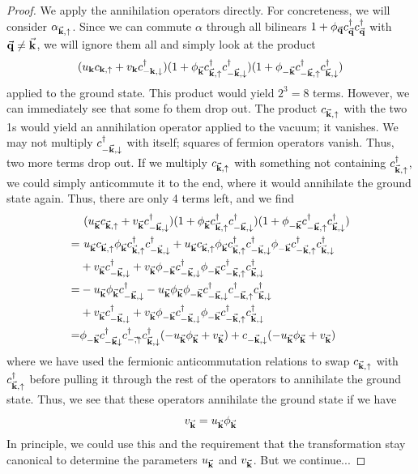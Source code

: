 \begin{proof}
	We apply the annihilation operators directly. For concreteness, we will consider $\alpha_{\va k,\uparrow}$. Since we can commute $\alpha$ through all bilinears $1+\phi_{\va q}c_{\va q}^\dagger c_{\va q}^\dagger$ with $\va q \neq \va k$, we will ignore them all and simply look at the product
	\[( u_{\mathbf{k}} c_{\mathbf{k},\uparrow} + v_{\mathbf{k}} c^\dagger_{-\mathbf{k},\downarrow})(1+\phi_{\va k}c_{\va k,\uparrow}^\dagger c_{-\va k,\downarrow}^\dagger)(1+\phi_{-\va k}c_{-\va k,\uparrow}^\dagger c_{\va k,\downarrow}^\dagger)\]
	applied to the ground state. This product would yield $2^3=8$ terms. However, we can immediately see that some fo them drop out. The product $c_{\va k,\uparrow}$ with the two 1s would yield an annihilation operator applied to the vacuum; it vanishes. We may not multiply $c_{-\va k,\downarrow}^\dagger$ with itself; squares of fermion operators vanish. Thus, two more terms drop out. If we multiply $c_{\va k,\uparrow}$ with something not containing $c_{\va k,\uparrow}^\dagger$, we could simply anticommute it to the end, where it would annihilate the ground state again. Thus, there are only 4 terms left, and we find
	\begin{align*}
		&~( u_{\va{k}} c_{\va{k},\uparrow} + v_{\va{k}} c^\dagger_{-\va{k},\downarrow})(1+\phi_{\va k}c_{\va k,\uparrow}^\dagger c_{-\va k,\downarrow}^\dagger)(1+\phi_{-\va k}c_{-\va k,\uparrow}^\dagger c_{\va k,\downarrow}^\dagger)\\
		=&~u_{\va k}c_{\va k,\uparrow} \phi_{\va k}c_{\va k,\uparrow}^\dagger c_{-\va k,\downarrow}^\dagger + u_{\va k}c_{\va k,\uparrow} \phi_{\va k}c_{\va k,\uparrow}^\dagger c_{-\va k,\downarrow}^\dagger \phi_{-\va k}c^{\dagger}_{-\va k,\uparrow}c_{\va k,\downarrow}^\dagger \\
		&+ v_{\va k}c_{-\va k,\downarrow}^\dagger + v_{\va k}\phi_{-\va k}c_{-\va k,\downarrow}^\dagger \phi_{-\va k}c_{-\va k,\uparrow}^\dagger c_{\va k,\downarrow}^\dagger\\
		=& -u_{\va k}\phi_{\va k}c_{-\va k,\downarrow}^\dagger - u_{\va k}\phi_{\va k}\phi_{-\va k}c_{-\va k,\downarrow}^\dagger c_{-\va k,\uparrow}^\dagger c_{\va k,\downarrow}^\dagger\\
		&+ v_{\va k}c_{-\va k,\downarrow}^\dagger + v_{\va k}\phi_{-\va k}c_{-\va k,\downarrow}^\dagger \phi_{-\va k}c_{-\va k,\uparrow}^\dagger c_{\va k,\downarrow}^\dagger\\
		=&\phi_{-\va k}c_{-\va k\downarrow}^\dagger c_{-\va ,\uparrow}^\dagger c_{\va k,\downarrow}^\dagger (-u_{\va k}\phi_{\va k} +v_{\va k})+c_{-\va k,\downarrow}(-u_{\va k}\phi_{\va k} +v_{\va k})
	\end{align*}
	where we have used the fermionic anticommutation relations to swap $c_{\va k,\uparrow}$ with $c_{\va k,\uparrow}^\dagger$ before pulling it through the rest of the operators to annihilate the ground state. Thus, we see that these operators annihilate the ground state if we have
	\[v_{\va k} = u_{\va k}\phi_{\va k}\]
	In principle, we could use this and the requirement that the transformation stay canonical to determine the parameters $u_{\va k}$ and $v_{\va k}$. But we continue...
	

\end{proof}
